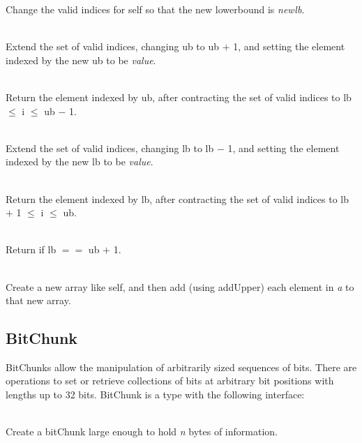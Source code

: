 \begin{desc}
    Change the valid indices for self so that the new lowerbound is {\it newlb}.
  \item[\kw{operation} addUpper\/\LB{}value \CO{} T\/\RB{}]~\\
    Extend the set of valid indices, changing ub to
    ub $+$ 1, and setting the element indexed by the new
    ub to be {\it value}.
  \item[\kw{operation} removeUpper \returns{} \/\LB{}T\/\RB{}]~\\
    Return the element indexed by ub, after contracting
    the set of valid indices to lb $\leq$ i $\leq$ ub $-$ 1.
  \item[\kw{operation} addLower\/\LB{}value \CO{} T\/\RB{}]~\\
    Extend the set of valid indices, changing lb to
    lb $-$ 1, and setting
    the element indexed by the new lb to be {\it value}.
  \item[\kw{operation} removeLower \returns{} \/\LB{}T\/\RB{}]~\\
    Return the element indexed by lb, after contracting
    the set of valid indices to lb $+$ 1 $\leq$ i $\leq$ ub.
  \item[\kw{function}  empty \returns{} \/\LB{}\tn{Boolean}\/\RB{}]~\\
    Return  if lb $==$ ub $+$ 1.
  \item[\kw{operation} catenate\/\LB{}a \CO{} RIS\/\RB{} \returns{} \/\LB{}r \CO{} aNewArrayType\/\RB{}]~\\
    Create a new array like self, and then add (using addUpper) each element
    in {\it a} to that new array.
\end{desc}

\subsection{BitChunk}
\label{builtin BitChunk}
BitChunks allow the manipulation of arbitrarily sized sequences of bits.
There are operations to set or retrieve collections of bits at arbitrary bit
positions with lengths up to 32 bits.
BitChunk is a type with the following interface:

\begin{desc}
  \item[\kw{export} \kw{operation} create\/\LB{}n \CO{} \tn{Integer}\/\RB{} \returns{} \/\LB{}Bitchunk\/\RB{}]~\\
    Create a bitChunk large enough to hold {\it n\/} bytes of information.
\end{desc}


